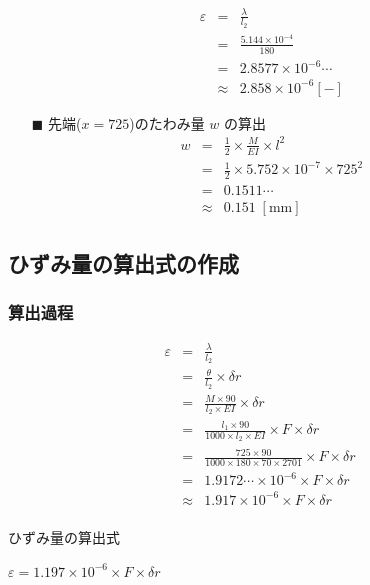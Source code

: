 \documentclass[twocolumn,a4j]{jsarticle}
\begin{document}
\begin{itemize}
          \begin{eqnarray*}
              \varepsilon &=& \frac{\lambda}{l_2}\\
              &=& \frac{5.144 × 10^{-4}}{180}\\
              &=& 2.8577 ×　10^{-6}\cdots\\
              &\approx& 2.858 × 10^{-6} \left[\mathrm{-}\right]
          \end{eqnarray*}
    \item [$\blacksquare$] 先端($x=725$)のたわみ量 $w$ の算出
          \begin{eqnarray*}
              w &=& \frac{1}{2} × \frac{M}{EI} × l^2\\
              &=& \frac{1}{2} × 5.752 × 10^{-7} × 725^2\\
              &=& 0.1511 \cdots\\
              &\approx& 0.151 \;\left[\mathrm{mm}\right]
          \end{eqnarray*}
\end{itemize}

\newpage

\subsection{ひずみ量の算出式の作成}

\subsubsection{算出過程}
\begin{eqnarray*}
    \varepsilon &=& \frac{\lambda}{l_2}\\
    &=& \frac{\theta}{l_2} × \delta r\\
    &=& \frac{M × 90}{l_2 × EI} × \delta r\\
    &=& \frac{l_1 × 90}{1000 × l_2 × EI} × F × \delta r\\
    &=& \frac{725 × 90}{1000 × 180 × 70 × 2701} × F × \delta r\\
    &=& 1.9172 \cdots × 10^{-6} × F × \delta r\\
    &\approx& 1.917 × 10^{-6} × F × \delta r\\
\end{eqnarray*}

\begin{itembox}[l]{ひずみ量の算出式}
    \begin{center}
        $\displaystyle \varepsilon = 1.197 × 10^{-6} × F × \delta r$
    \end{center}
\end{itembox}
\end{document}
